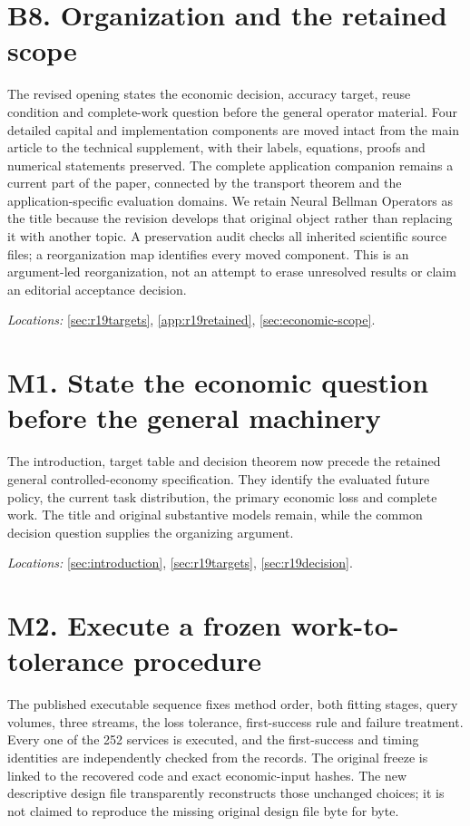 \documentclass[ecta,nameyear,draft]{econsocart}
\theoremstyle{definition}
\theoremstyle{remark}
\begin{document}
\section*{B8. Organization and the retained scope}
The revised opening states the economic decision, accuracy target, reuse condition and complete-work question before the general operator material. Four detailed capital and implementation components are moved intact from the main article to the technical supplement, with their labels, equations, proofs and numerical statements preserved. The complete application companion remains a current part of the paper, connected by the transport theorem and the application-specific evaluation domains. We retain Neural Bellman Operators as the title because the revision develops that original object rather than replacing it with another topic. A preservation audit checks all inherited scientific source files; a reorganization map identifies every moved component. This is an argument-led reorganization, not an attempt to erase unresolved results or claim an editorial acceptance decision.

\noindent\emph{Locations:} \ref{sec:r19targets}, \ref{app:r19retained}, \ref{sec:economic-scope}.

\section*{M1. State the economic question before the general machinery}
The introduction, target table and decision theorem now precede the retained general controlled-economy specification. They identify the evaluated future policy, the current task distribution, the primary economic loss and complete work. The title and original substantive models remain, while the common decision question supplies the organizing argument.

\noindent\emph{Locations:} \ref{sec:introduction}, \ref{sec:r19targets}, \ref{sec:r19decision}.

\section*{M2. Execute a frozen work-to-tolerance procedure}
The published executable sequence fixes method order, both fitting stages, query volumes, three streams, the loss tolerance, first-success rule and failure treatment. Every one of the 252 services is executed, and the first-success and timing identities are independently checked from the records. The original freeze is linked to the recovered code and exact economic-input hashes. The new descriptive design file transparently reconstructs those unchanged choices; it is not claimed to reproduce the missing original design file byte for byte.
\end{document}
